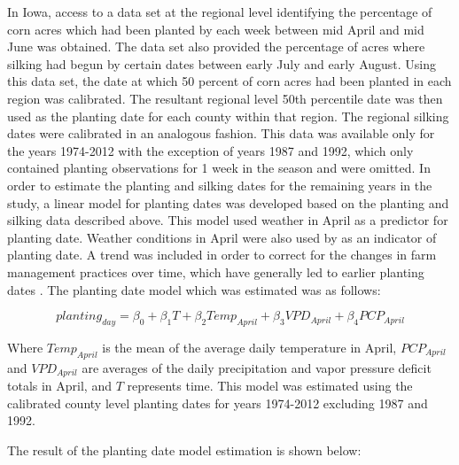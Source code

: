 In Iowa, access to a data set at the regional level identifying the percentage of corn acres which had been planted by each week between mid April and mid June was obtained. The data set also provided the percentage of acres where silking had begun by certain dates between early July and early August. Using this data set, the date at which 50 percent of corn acres had been planted in each region was calibrated. The resultant regional level 50th percentile date was then used as the planting date for each county within that region. The regional silking dates were calibrated in an analogous fashion. This data was available only for the years 1974-2012 with the exception of years 1987 and 1992, which only contained planting observations for 1 week in the season and were omitted. In order to estimate the planting and silking dates for the remaining years in the study, a linear model for planting dates was developed based on the planting and silking data described above. This model used weather in April as a predictor for planting date. Weather conditions in April were also used by \cite{gupta1985predicting} as an indicator of planting date. A trend was included in order to correct for the changes in farm management practices over time, which have generally led to earlier planting dates \citep{kucharik2006multidecadal}. The planting date model which was estimated was as follows:

\begin{equation}
  planting_{day}=\beta_0+\beta_1T+\beta_2Temp_{April}+\beta_3VPD_{April}+\beta_4PCP_{April}
\end{equation}

Where $Temp_{April}$ is the mean of the average daily temperature in April, $PCP_{April}$ and $VPD_{April}$ are averages of the daily precipitation and vapor pressure deficit totals in April, and $T$ represents time. This model was estimated using the calibrated county level planting dates for years 1974-2012 excluding 1987 and 1992.

The result of the planting date model estimation is shown below:



